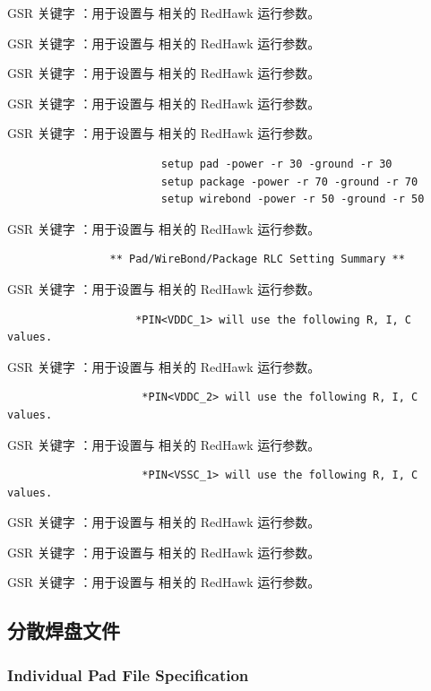 GSR 关键字 ：用于设置与  相关的 RedHawk 运行参数。

GSR 关键字 ：用于设置与  相关的 RedHawk 运行参数。

GSR 关键字 ：用于设置与  相关的 RedHawk 运行参数。

GSR 关键字 ：用于设置与  相关的 RedHawk 运行参数。

GSR 关键字 ：用于设置与  相关的 RedHawk 运行参数。

\begin{lstlisting}
                        setup pad -power -r 30 -ground -r 30
                        setup package -power -r 70 -ground -r 70
                        setup wirebond -power -r 50 -ground -r 50
\end{lstlisting}

GSR 关键字 ：用于设置与  相关的 RedHawk 运行参数。

\begin{lstlisting}
                ** Pad/WireBond/Package RLC Setting Summary **
\end{lstlisting}

GSR 关键字 ：用于设置与  相关的 RedHawk 运行参数。

\begin{lstlisting}
                    *PIN<VDDC_1> will use the following R, I, C values.
\end{lstlisting}

GSR 关键字 ：用于设置与  相关的 RedHawk 运行参数。

\begin{lstlisting}
                     *PIN<VDDC_2> will use the following R, I, C values.
\end{lstlisting}

GSR 关键字 ：用于设置与  相关的 RedHawk 运行参数。

\begin{lstlisting}
                     *PIN<VSSC_1> will use the following R, I, C values.
\end{lstlisting}

GSR 关键字 ：用于设置与  相关的 RedHawk 运行参数。

GSR 关键字 ：用于设置与  相关的 RedHawk 运行参数。

GSR 关键字 ：用于设置与  相关的 RedHawk 运行参数。

\subsection{分散焊盘文件}
\subsubsection*{Individual Pad File Specification}

